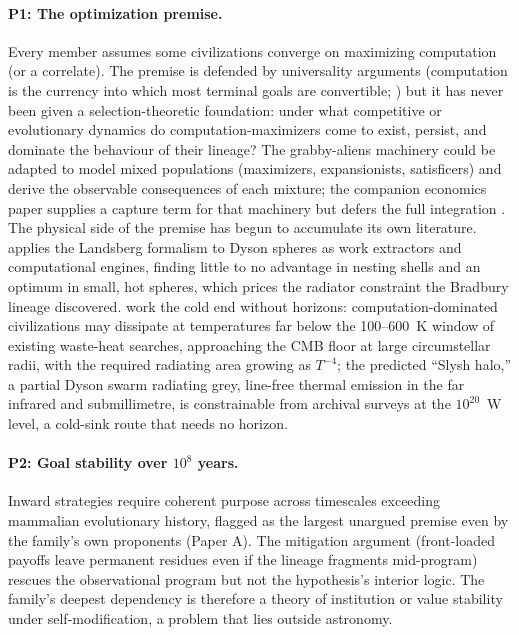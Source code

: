 \documentclass[11pt]{article}
\begin{document}
\paragraph{P1: The optimization premise.} Every member assumes some civilizations converge on maximizing computation (or a correlate). The premise is defended by universality arguments (computation is the currency into which most terminal goals are convertible; \citealt{Smart2012,Sandberg2016,Bostrom2003}) but it has never been given a selection-theoretic foundation: under what competitive or evolutionary dynamics do computation-maximizers come to exist, persist, and dominate the behaviour of their lineage? The grabby-aliens machinery \citep{Hanson2021,Olson2015} could be adapted to model mixed populations (maximizers, expansionists, satisficers) and derive the observable consequences of each mixture; the companion economics paper supplies a capture term for that machinery but defers the full integration \citep{Swanson2026Economics}. The physical side of the premise has begun to accumulate its own literature. \citet{Wright2023Landsberg} applies the Landsberg formalism to Dyson spheres as work extractors and computational engines, finding little to no advantage in nesting shells and an optimum in small, hot spheres, which prices the radiator constraint the Bradbury lineage discovered. \citet{Garrett2026Slysh} work the cold end without horizons: computation-dominated civilizations may dissipate at temperatures far below the 100--600~K window of existing waste-heat searches, approaching the CMB floor at large circumstellar radii, with the required radiating area growing as $T^{-4}$; the predicted ``Slysh halo,'' a partial Dyson swarm radiating grey, line-free thermal emission in the far infrared and submillimetre, is constrainable from archival surveys at the $10^{20}$~W level, a cold-sink route that needs no horizon.

\paragraph{P2: Goal stability over $10^{8}$ years.} Inward strategies require coherent purpose across timescales exceeding mammalian evolutionary history, flagged as the largest unargued premise even by the family's own proponents (Paper A). The mitigation argument (front-loaded payoffs leave permanent residues even if the lineage fragments mid-program) rescues the observational program but not the hypothesis's interior logic. The family's deepest dependency is therefore a theory of institution or value stability under self-modification, a problem that lies outside astronomy.
\end{document}
